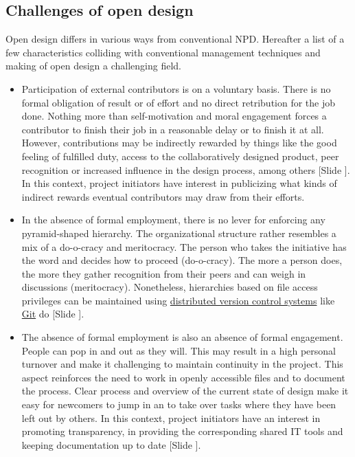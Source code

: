\documentclass{article}
\newcounter{slide}
\begin{document}
\subsection{Challenges of open design}
\label{sec:challengesOD}
Open design differs in various ways from conventional NPD. Hereafter a list of a few characteristics colliding with conventional management techniques and making of open design a challenging field.
\begin{itemize}
  \item Participation of external contributors is on a voluntary basis. There is no formal obligation of result or of effort and no direct retribution for the job done. Nothing more than self-motivation and moral engagement forces a contributor to finish their job in a reasonable delay or to finish it at all. However, contributions may be indirectly rewarded by things like the good feeling of fulfilled duty, access to the collaboratively designed product, peer recognition or increased influence in the design process, among others {\color{blue}[Slide ]}. In this context, project initiators have interest in publicizing what kinds of indirect rewards eventual contributors may draw from their efforts.
	\item In the absence of formal employment, there is no lever for enforcing any pyramid-shaped hierarchy. The organizational structure rather resembles a mix of a do-o-cracy and meritocracy. The person who takes the initiative has the word and decides how to proceed (do-o-cracy). The more a person does, the more they gather recognition from their peers and can weigh in discussions (meritocracy). Nonetheless, hierarchies based on file access privileges can be maintained using \href{https://en.wikipedia.org/wiki/Distributed_version_control}{distributed version control systems} like \href{https://git-scm.com/}{Git} do {\color{blue}[Slide ]}.
	\item The absence of formal employment is also an absence of formal engagement. People can pop in and out as they will. This may result in a high personal turnover and make it challenging to maintain continuity in the project. This aspect reinforces the need to work in openly accessible files and to document the process. Clear process and overview of the current state of design make it easy for newcomers to jump in an to take over tasks where they have been left out by others. In this context, project initiators have an interest in promoting transparency, in providing the corresponding shared IT tools and keeping documentation up to date {\color{blue}[Slide ]}.

\end{itemize}
\end{document}
